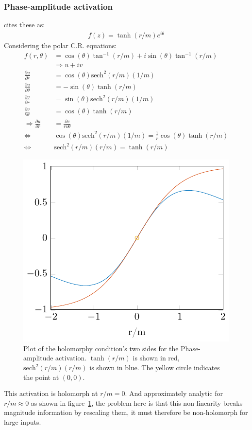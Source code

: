 \documentclass{article}
\begin{document}
\subsubsection{Phase-amplitude activation}
\cite{Scardapane} cites these as:
\begin{align}
f(z) = \tanh(r/m)e^{i\theta}
\end{align}
Considering the polar C.R. equations:
\begin{align}
f(r,\theta) &= \cos(\theta)\tan^{-1}(r/m) + i\sin(\theta)\tan^{-1}(r/m) \\
            &\Rightarrow u + iv \nonumber \\
\frac{\partial u}{\partial r} &= \cos(\theta)\text{sech}^2(r/m)(1/m) \\
\frac{\partial u}{\partial \theta} &= -\sin(\theta)\tanh(r/m) \\
\frac{\partial v}{\partial r} &= \sin(\theta)\text{sech}^2(r/m)(1/m) \\
\frac{\partial v}{\partial \theta} &= \cos(\theta)\tanh(r/m) \\
\Rightarrow  \frac{\partial u}{\partial r} &=\frac{\partial v}{r\partial \theta} \nonumber \\
\Leftrightarrow \qquad & \cos(\theta)\text{sech}^2(r/m)(1/m) = \frac{1}{r}\cos(\theta)\tanh(r/m) \\
\Leftrightarrow \qquad & \text{sech}^2(r/m)(r/m) = \tanh(r/m)
\label{eq:holo-pa}
\end{align}
\begin{figure}
\centering
\includegraphics{./img/phase_amplitude_cond.pdf}
\caption{Plot of the holomorphy condition's two sides for the Phase-amplitude activation. $\tanh(r/m)$ is shown in red, $\text{sech}^2(r/m)(r/m)$ is shown in blue. The yellow circle indicates the point at $(0,0)$.}
\label{fig:phase_amp}
\end{figure}
This activation is holomorph at $r/m = 0$. And approximately analytic for $r/m \approx 0$ as shown in figure~\ref{fig:phase_amp}, the problem here is that this non-linearity breaks magnitude information by rescaling them, it must therefore be non-holomorph for large inputs. 
\end{document}
